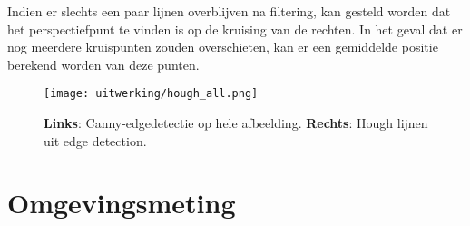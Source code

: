 Indien er slechts een paar lijnen overblijven na filtering, kan gesteld worden dat het perspectiefpunt te vinden is op de kruising van de rechten.
In het geval dat er nog meerdere kruispunten zouden overschieten, kan er een gemiddelde positie berekend worden van deze punten.

\begin{figure}
    \texttt{[image: uitwerking/hough\_all.png]}
    \caption{\textbf{Links}: Canny-edgedetectie op hele afbeelding. \textbf{Rechts}: Hough lijnen uit edge detection.}
    \label{fig:hough_all}
\end{figure}


\section{Omgevingsmeting} \label{sec:omgevingsmeting}


